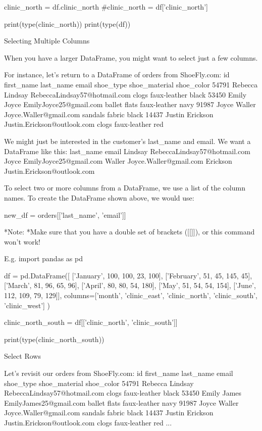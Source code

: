 \documentclass{journal}
\begin{document}
clinic_north = df.clinic_north
#clinic_north = df['clinic_north']

print(type(clinic_north))
print(type(df))


Selecting Multiple Columns

When you have a larger DataFrame, you might want to select just a few columns.

For instance, let's return to a DataFrame of orders from ShoeFly.com:
id 	first_name 	last_name 	email 	shoe_type 	shoe_material 	shoe_color
54791 	Rebecca 	Lindsay 	RebeccaLindsay57@hotmail.com 	clogs 	faux-leather 	black
53450 	Emily 	Joyce 	EmilyJoyce25@gmail.com 	ballet flats 	faux-leather 	navy
91987 	Joyce 	Waller 	Joyce.Waller@gmail.com 	sandals 	fabric 	black
14437 	Justin 	Erickson 	Justin.Erickson@outlook.com 	clogs 	faux-leather 	red

We might just be interested in the customer's last_name and email. We want a DataFrame like this:
last_name 	email
Lindsay 	RebeccaLindsay57@hotmail.com
Joyce 	EmilyJoyce25@gmail.com
Waller 	Joyce.Waller@gmail.com
Erickson 	Justin.Erickson@outlook.com

To select two or more columns from a DataFrame, we use a list of the column names. To create the DataFrame shown above, we would use:

new_df = orders[['last_name', 'email']]

*Note: *Make sure that you have a double set of brackets ([[]]), or this command won't work!

E.g.
import pandas as pd

df = pd.DataFrame([
  ['January', 100, 100, 23, 100],
  ['February', 51, 45, 145, 45],
  ['March', 81, 96, 65, 96],
  ['April', 80, 80, 54, 180],
  ['May', 51, 54, 54, 154],
  ['June', 112, 109, 79, 129]],
  columns=['month', 'clinic_east',
           'clinic_north', 'clinic_south',
           'clinic_west']
)

clinic_north_south = df[['clinic_north', 'clinic_south']]

print(type(clinic_north_south))

Select Rows

Let's revisit our orders from ShoeFly.com:
id 	first_name 	last_name 	email 	shoe_type 	shoe_material 	shoe_color
54791 	Rebecca 	Lindsay 	RebeccaLindsay57@hotmail.com 	clogs 	faux-leather 	black
53450 	Emily 	James 	EmilyJames25@gmail.com 	ballet flats 	faux-leather 	navy
91987 	Joyce 	Waller 	Joyce.Waller@gmail.com 	sandals 	fabric 	black
14437 	Justin 	Erickson 	Justin.Erickson@outlook.com 	clogs 	faux-leather 	red
... 						
\end{document}
